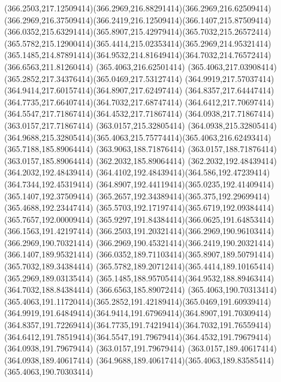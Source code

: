 {{	\curveto(366.2503,217.12509414)(366.2969,216.88291414)(366.2969,216.62509414)
	\curveto(366.2969,216.37509414)(366.2419,216.12509414)(366.1407,215.87509414)
	\curveto(366.0352,215.63291414)(365.8907,215.42979414)(365.7032,215.26572414)
	\curveto(365.5782,215.12900414)(365.4414,215.02353414)(365.2969,214.95321414)
	\curveto(365.1485,214.87891414)(364.9532,214.81649414)(364.7032,214.76572414)
	\lineto(366.6563,211.81260414)
	\closepath
	\moveto(365.4063,216.62501414)
	\curveto(365.4063,217.03908414)(365.2852,217.34376414)(365.0469,217.53127414)
	\curveto(364.9919,217.57037414)(364.9414,217.60157414)(364.8907,217.62497414)
	\curveto(364.8357,217.64447414)(364.7735,217.66407414)(364.7032,217.68747414)
	\curveto(364.6412,217.70697414)(364.5547,217.71867414)(364.4532,217.71867414)
	\lineto(364.0938,217.71867414)
	\lineto(363.0157,217.71867414)
	\lineto(363.0157,215.32805414)
	\lineto(364.0938,215.32805414)
	\curveto(364.9688,215.32805414)(365.4063,215.75774414)(365.4063,216.62493414)
	\closepath
	\moveto(365.7188,185.89064414)
	\lineto(363.9063,188.71876414)
	\lineto(363.0157,188.71876414)
	\lineto(363.0157,185.89064414)
	\lineto(362.2032,185.89064414)
	\lineto(362.2032,192.48439414)
	\lineto(364.2032,192.48439414)
	\curveto(364.4102,192.48439414)(364.586,192.47239414)(364.7344,192.45319414)
	\curveto(364.8907,192.44119414)(365.0235,192.41409414)(365.1407,192.37509414)
	\curveto(365.2657,192.34389414)(365.375,192.29699414)(365.4688,192.23447414)
	\curveto(365.5703,192.17197414)(365.6719,192.09384414)(365.7657,192.00009414)
	\curveto(365.9297,191.84384414)(366.0625,191.64853414)(366.1563,191.42197414)
	\curveto(366.2503,191.20321414)(366.2969,190.96103414)(366.2969,190.70321414)
	\curveto(366.2969,190.45321414)(366.2419,190.20321414)(366.1407,189.95321414)
	\curveto(366.0352,189.71103414)(365.8907,189.50791414)(365.7032,189.34384414)
	\curveto(365.5782,189.20712414)(365.4414,189.10165414)(365.2969,189.03135414)
	\curveto(365.1485,188.95705414)(364.9532,188.89463414)(364.7032,188.84384414)
	\lineto(366.6563,185.89072414)
	\closepath
	\moveto(365.4063,190.70313414)
	\curveto(365.4063,191.11720414)(365.2852,191.42189414)(365.0469,191.60939414)
	\curveto(364.9919,191.64849414)(364.9414,191.67969414)(364.8907,191.70309414)
	\curveto(364.8357,191.72269414)(364.7735,191.74219414)(364.7032,191.76559414)
	\curveto(364.6412,191.78519414)(364.5547,191.79679414)(364.4532,191.79679414)
	\lineto(364.0938,191.79679414)
	\lineto(363.0157,191.79679414)
	\lineto(363.0157,189.40617414)
	\lineto(364.0938,189.40617414)
	\curveto(364.9688,189.40617414)(365.4063,189.83585414)(365.4063,190.70303414)
}}
